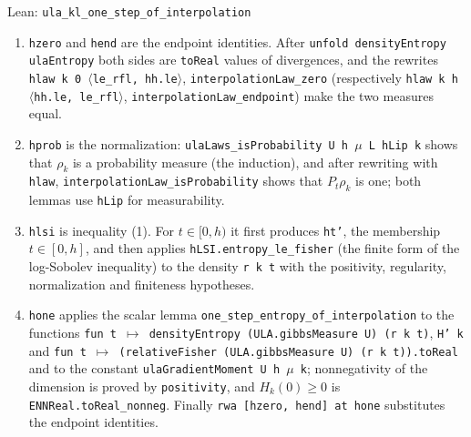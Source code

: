 \documentclass[11pt,a4paper]{report}
\begin{document}
\begin{leanbox}{Lean: \texttt{ula\_\allowbreak{}kl\_\allowbreak{}one\_\allowbreak{}step\_\allowbreak{}of\_\allowbreak{}interpolation}}
\begin{enumerate}
\item \texttt{hzero} and \texttt{hend} are the endpoint identities. After \texttt{unfold density\allowbreak{}Entropy ula\allowbreak{}Entropy} both sides are \texttt{to\allowbreak{}Real} values of divergences, and the rewrites \texttt{hlaw k 0 \ensuremath{\langle}le\_\allowbreak{}rfl, hh.\allowbreak{}le\ensuremath{\rangle}}, \texttt{interpolation\allowbreak{}Law\_\allowbreak{}zero} (respectively \texttt{hlaw k h \ensuremath{\langle}hh.\allowbreak{}le, le\_\allowbreak{}rfl\ensuremath{\rangle}}, \texttt{interpolation\allowbreak{}Law\_\allowbreak{}endpoint}) make the two measures equal.

\item \texttt{hprob} is the normalization: \texttt{ula\allowbreak{}Laws\_\allowbreak{}is\allowbreak{}Probability U h \ensuremath{\mu} L h\allowbreak{}Lip k} shows that \(\rho_k\) is a probability measure (the induction), and after rewriting with \texttt{hlaw}, \texttt{interpolation\allowbreak{}Law\_\allowbreak{}is\allowbreak{}Probability} shows that \(P_t\rho_k\) is one; both lemmas use \texttt{h\allowbreak{}Lip} for measurability.

\item \texttt{hlsi} is inequality (1). For \(t\in[0,h)\) it first produces \texttt{ht'}, the membership \(t\in[0,h]\), and then applies \texttt{h\allowbreak{}LSI.\allowbreak{}entropy\_\allowbreak{}le\_\allowbreak{}fisher} (the finite form of the log-Sobolev inequality) to the density \texttt{r k t} with the positivity, regularity, normalization and finiteness hypotheses.

\item \texttt{hone} applies the scalar lemma \texttt{one\_\allowbreak{}step\_\allowbreak{}entropy\_\allowbreak{}of\_\allowbreak{}interpolation} to the functions \texttt{fun t \ensuremath{\mapsto} density\allowbreak{}Entropy (ULA.\allowbreak{}gibbs\allowbreak{}Measure U) (r k t)}, \texttt{H' k} and \texttt{fun t \ensuremath{\mapsto} (relative\allowbreak{}Fisher (ULA.\allowbreak{}gibbs\allowbreak{}Measure U) (r k t)).\allowbreak{}to\allowbreak{}Real} and to the constant \texttt{ula\allowbreak{}Gradient\allowbreak{}Moment U h \ensuremath{\mu} k}; nonnegativity of the dimension is proved by \texttt{positivity}, and \(H_k(0)\ge0\) is \texttt{ENNReal.\allowbreak{}to\allowbreak{}Real\_\allowbreak{}nonneg}. Finally \texttt{rwa [hzero, hend] at hone} substitutes the endpoint identities.

\end{enumerate}
\end{leanbox}
\end{document}
